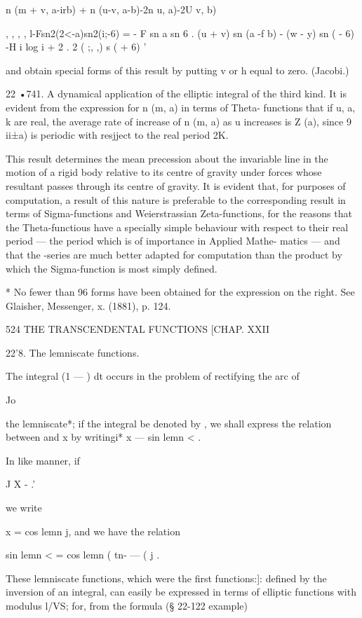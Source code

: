 n (m + v, a-irb) + n (u-v, a-b)-2n u, a)-2U v, b)

, , , , l-Fsn2(2<-a)sn2(i;-6) = - F sn a sn 6 . (u + v) sn (a -f b) -
(w - y) sn ( - 6) -H i log i + 2 . 2 ( ;, ,) s ( + 6) '

and obtain special forms of this result by putting v or h equal to
zero. (Jacobi.)

22 •741. A dynamical application of the elliptic integral of the third
kind. It is evident from the expression for n (m, a) in terms of
Theta- functions that if u, a, k are real, the average rate of
increase of n (m, a) as u increases is Z (a), since 9 ii±a) is
periodic with resjject to the real period 2K.

This result determines the mean precession about the invariable line
in the motion of a rigid body relative to its centre of gravity under
forces whose resultant passes through its centre of gravity. It is
evident that, for purposes of computation, a result of this nature is
preferable to the corresponding result in terms of Sigma-functions and
Weierstrassian Zeta-functions, for the reasons that the
Theta-functious have a specially simple behaviour with respect to
their real period — the period which is of importance in Applied
Mathe- matics — and that the -series are much better adapted for
computation than the product by which the Sigma-function is most
simply defined.

* No fewer than 96 forms have been obtained for the expression on the
right. See Glaisher, Messenger, x. (1881), p. 124.



524 THE TRANSCENDENTAL FUNCTIONS [CHAP. XXII

22'8. The lemniscate functions.

The integral (1 — ) dt occurs in the problem of rectifying the arc of

Jo

the lemniscate*; if the integral be denoted by , we shall express the
relation between and x by writingi* x — sin lemn < .

In like manner, if

J X - .'

we write

x = cos lemn j, and we have the relation



sin lemn < = cos lemn ( tn- — ( j .



These lemniscate functions, which were the first functions:]: defined
by the inversion of an integral, can easily be expressed in terms of
elliptic functions with modulus l/VS; for, from the formula (§ 22-122
example)

